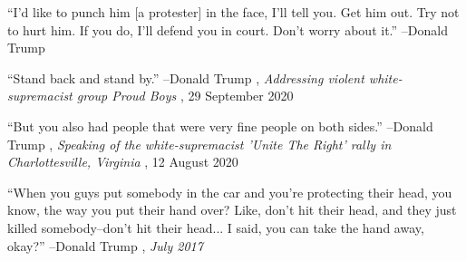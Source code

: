 \documentclass{article}%
\begin{document}
\linebreak%
\vspace{1mm}%
\begin{minipage}{\textwidth}%
\flushleft%
“I'd like to punch him {[}a protester{]} in the face, I'll tell you. Get him out. Try not to hurt him. If you do, I'll defend you in court. Don't worry about it.”%
\linebreak%
\vspace{1mm}%
–Donald Trump%
\linebreak%
\vspace{1mm}%
\end{minipage}%
\linebreak%
\vspace{1mm}%
\begin{minipage}{\textwidth}%
\flushleft%
“Stand back and stand by.”%
\linebreak%
\vspace{1mm}%
–Donald Trump%
, \textit{Addressing violent white-supremacist group Proud Boys}%
, 29 September 2020%
\linebreak%
\vspace{1mm}%
\end{minipage}%
\linebreak%
\vspace{1mm}%
\begin{minipage}{\textwidth}%
\flushleft%
“But you also had people that were very fine people on both sides.”%
\linebreak%
\vspace{1mm}%
–Donald Trump%
, \textit{Speaking of the white-supremacist 'Unite The Right' rally in Charlottesville, Virginia}%
, 12 August 2020%
\linebreak%
\vspace{1mm}%
\end{minipage}%
\linebreak%
\vspace{1mm}%
\begin{minipage}{\textwidth}%
\flushleft%
“When you guys put somebody in the car and you're protecting their head, you know, the way you put their hand over? Like, don't hit their head, and they just killed somebody–don't hit their head... I said, you can take the hand away, okay?”%
\linebreak%
\vspace{1mm}%
–Donald Trump%
, \textit{July 2017}%
\linebreak%
\vspace{1mm}%
\end{minipage}%
\end{document}
